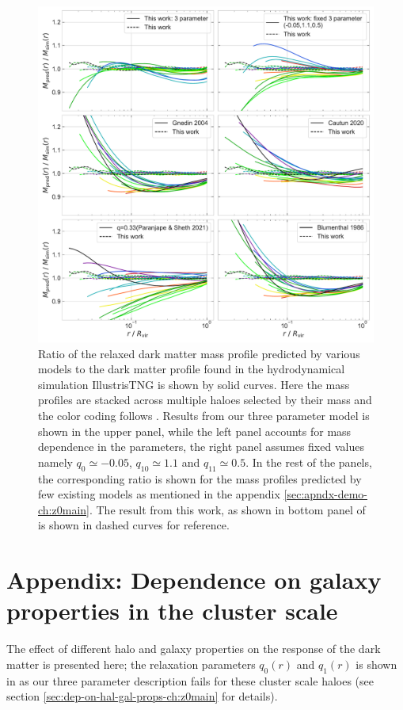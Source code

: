 \begin{figure}
    \centering
    \includegraphics[width=0.85\linewidth]{plots/relxn_model_comparison.pdf}
    \caption{Ratio of the relaxed dark matter mass profile predicted by various models to the dark matter profile found in the hydrodynamical simulation IllustrisTNG is shown by solid curves. Here the mass profiles are stacked across multiple haloes selected by their mass and the color coding follows . Results from our three parameter model  is shown in the upper panel, while the left panel accounts for mass dependence in the parameters, the right panel assumes fixed values namely $q_0\simeq-0.05$, $q_{10}\simeq1.1$ and $q_{11}\simeq0.5$. In the rest of the panels, the corresponding ratio is shown for the mass profiles predicted by few existing models as mentioned in the appendix \ref{sec:apndx-demo-ch:z0main}. The result from this work, as shown in bottom panel of  is shown in dashed curves for reference.}
    \label{fig:relxn_models_compare-ch:z0main}
\end{figure}


\section{Appendix: Dependence on galaxy properties in the cluster scale}
The effect of different halo and galaxy properties on the response of the dark matter is presented here; the relaxation parameters $q_0(r)$ and $q_1(r)$ is shown in  as our three parameter description fails for these cluster scale haloes (see section \ref{sec:dep-on-hal-gal-props-ch:z0main} for details).


